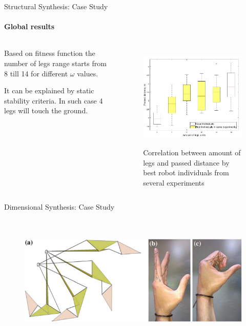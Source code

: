 \documentclass[aspectratio=169]{beamer}
\begin{document}
\begin{frame}[t]{Structural Synthesis: Case Study}
    \framesubtitle{Global results}
    \begin{columns}[T,onlytextwidth]
        \begin{column}{0.49\textwidth}
            Based on fitness function the number of legs range starts from 8 till 14 for different $\omega$ values. 
            
            It can be explained by static stability criteria. In such case 4 legs will touch the ground.    
        \end{column}
        \begin{column}{0.49\textwidth}
            \vspace{-1.5cm}
            \begin{figure}[H]
                \centering\includegraphics[height=5cm,width=1\textwidth,keepaspectratio]{box_plot_structural_synthesis.png}
                \caption*{Correlation between amount of legs and passed distance by best robot individuals from several experiments}
                \label{fig:box_plot_structural_synthesis.png}
            \end{figure}
        \end{column}
    \end{columns}
\end{frame}


\begin{frame}[t]{Dimensional Synthesis: Case Study}
\framesubtitle{}
\vspace{-0.6cm}
    \begin{figure}[H]
        \centering\includegraphics[height=6cm,width=1\textwidth,keepaspectratio]{dimensional_synthesis_exp.png}
        \label{fig:dimensional_synthesis_exp.png}
    \end{figure}
\end{frame}
\end{document}
